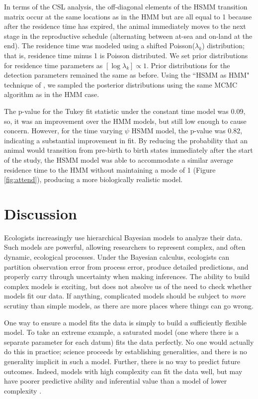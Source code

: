 \documentclass[12pt,english]{article}
\begin{document}
\begin{spacing}{1.9}
In terms of the CSL analysis, the off-diagonal elements of the HSMM
transition matrix occur at the same locations as in the HMM but are
all equal to 1 because after the residence time has expired, the
animal immediately moves to the next stage in the reproductive
schedule (alternating between at-sea and on-land at the end). The
residence time was modeled using a shifted Poisson($\lambda_k$)
distribution; that is, residence time minus 1 is Poisson
distributed. We set prior distributions for residence time parameters
as $[\log \lambda_k] \propto 1$.  Prior distributions for the
detection parameters remained the same as before.  Using the ``HSMM as
HMM" technique of \citet{langrock2011hidden}, we sampled the posterior
distributions using the same MCMC algorithm as in the HMM case.

The p-value for the Tukey fit statistic under the constant time model
was $0.09$, so, it was an improvement over the HMM models, but still
low enough to cause concern. However, for the time varying $\psi$ HSMM
model, the p-value was 0.82, indicating a substantial improvement in
fit. By reducing the probability that an animal would transition from
pre-birth to birth states immediately after the start of the study,
the HSMM model was able to accommodate a similar average residence
time to the HMM without maintaining a mode of 1 (Figure
\ref{fig:attend}), producing a more biologically realistic model.



\section{Discussion}

Ecologists increasingly use hierarchical Bayesian models to analyze
their data.  Such models are powerful, allowing researchers to
represent complex, and often dynamic, ecological processes.  Under the
Bayesian calculus, ecologists can partition observation error from
process error, produce detailed predictions, and properly carry
through uncertainty when making inferences.  The ability to build
complex models is exciting, but does not absolve us of the need to
check whether models fit our data.  If anything, complicated models
should be subject to \textit{more} scrutiny than simple models, as
there are more places where things can go wrong.


One way to ensure a model fits the data is simply to build a
sufficiently flexible model.  To take an extreme example, a saturated
model (one where there is a separate parameter for each datum) fits
the data perfectly.  No one would actually do this in practice;
science proceeds by establishing generalities, and there is no
generality implicit in such a model.  Further, there is no way to
predict future outcomes.  Indeed, models with high complexity can fit
the data well, but may have poorer predictive ability and inferential
value than a model of lower complexity
\citep{BurnhamAnderson2002,HootenHobbs2015}.


\end{spacing}
\end{document}
